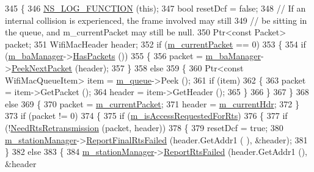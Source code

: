 \begin{DoxyCode}
345 \{
346   \hyperlink{log-macros-disabled_8h_a90b90d5bad1f39cb1b64923ea94c0761}{NS\_LOG\_FUNCTION} (\textcolor{keyword}{this});
347   \textcolor{keywordtype}{bool} resetDcf = \textcolor{keyword}{false};
348   \textcolor{comment}{// If an internal collision is experienced, the frame involved may still}
349   \textcolor{comment}{// be sitting in the queue, and m\_currentPacket may still be null.}
350   Ptr<const Packet> packet;
351   WifiMacHeader header;
352   \textcolor{keywordflow}{if} (\hyperlink{classns3_1_1DcaTxop_a3c454c21337aac0944f86caad8b7a719}{m\_currentPacket} == 0)
353     \{
354       \textcolor{keywordflow}{if} (\hyperlink{classns3_1_1EdcaTxopN_a7a79eaafe03995bb274451aa752b83b2}{m\_baManager}->\hyperlink{classns3_1_1BlockAckManager_aa4d33e4f453efea9967dc2ebb7142210}{HasPackets} ())
355         \{
356           packet = \hyperlink{classns3_1_1EdcaTxopN_a7a79eaafe03995bb274451aa752b83b2}{m\_baManager}->\hyperlink{classns3_1_1BlockAckManager_a27160e30a1652c3a2cf4c0fca44f4166}{PeekNextPacket} (header);
357         \}
358       \textcolor{keywordflow}{else}
359         \{
360           Ptr<const WifiMacQueueItem> item = \hyperlink{classns3_1_1DcaTxop_a7f42500857237f6f18aee436ef22ef62}{m\_queue}->Peek ();
361           \textcolor{keywordflow}{if} (item)
362             \{
363               packet = item->GetPacket ();
364               header = item->GetHeader ();
365             \}
366         \}
367     \}
368   \textcolor{keywordflow}{else}
369     \{
370       packet = \hyperlink{classns3_1_1DcaTxop_a3c454c21337aac0944f86caad8b7a719}{m\_currentPacket};
371       header = \hyperlink{classns3_1_1DcaTxop_ae965eb2f4d504e00526e751cd1dab3a6}{m\_currentHdr};
372     \}
373   \textcolor{keywordflow}{if} (packet != 0)
374     \{
375       \textcolor{keywordflow}{if} (\hyperlink{classns3_1_1EdcaTxopN_a2dbb9cad85e4871b031dc1169c88bb08}{m\_isAccessRequestedForRts})
376         \{
377           \textcolor{keywordflow}{if} (!\hyperlink{classns3_1_1DcaTxop_a91e4d3ef666784684ecad9bd4b229333}{NeedRtsRetransmission} (packet, header))
378             \{
379               resetDcf = \textcolor{keyword}{true};
380               \hyperlink{classns3_1_1DcaTxop_af78d36622900e857d31315038946d8f6}{m\_stationManager}->\hyperlink{classns3_1_1WifiRemoteStationManager_ab47024978076386cbfe3f0235bba742b}{ReportFinalRtsFailed} (header.GetAddr1 (
      ), &header);
381             \}
382           \textcolor{keywordflow}{else}
383             \{
384               \hyperlink{classns3_1_1DcaTxop_af78d36622900e857d31315038946d8f6}{m\_stationManager}->\hyperlink{classns3_1_1WifiRemoteStationManager_ad3844da681fd76f907293f5ff45187ec}{ReportRtsFailed} (header.GetAddr1 (), &header

\end{DoxyCode}
